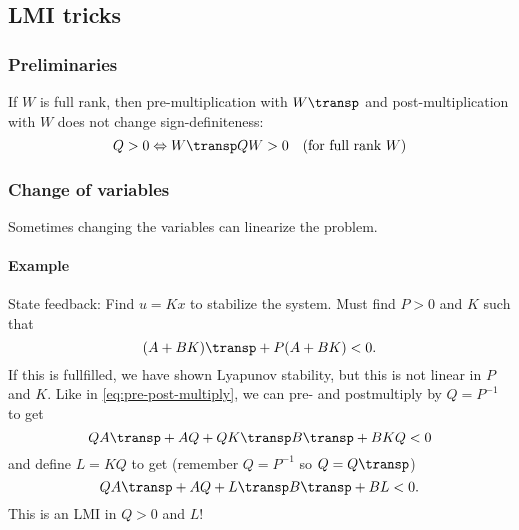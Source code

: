 \subsection{LMI tricks}
\subsubsection{Preliminaries}
If $W$ is full rank, then pre-multiplication with $W\transp$ and post-multiplication with $W$ does not change sign-definiteness:
\begin{equation}\label{eq:pre-post-multiply}
    Q > 0 \Leftrightarrow W\transp Q W > 0 \quad (\mbox{for full rank } W)
\end{equation}

\subsubsection{Change of variables}
Sometimes changing the variables can linearize the problem.
\paragraph{Example} State feedback: Find $u = Kx$ to stabilize the system. Must find $P > 0$ and $K$ such that
\begin{equation}
    (A + BK)\transp + P(A + BK) < 0.
\end{equation}
If this is fullfilled, we have shown Lyapunov stability, but this is not linear in $P$ and $K$. Like in \eqref{eq:pre-post-multiply}, we can pre- and postmultiply by $Q = P^{-1}$ to get
\begin{equation}
    QA\transp + AQ + QK\transp B\transp + BKQ < 0
\end{equation}
and define $L = KQ$ to get (remember $Q = P^{-1}$ so $Q = Q\transp$)
\begin{equation}
    QA\transp + AQ + L\transp B\transp + BL < 0.
\end{equation}
This is an LMI in $Q > 0$ and $L$!


